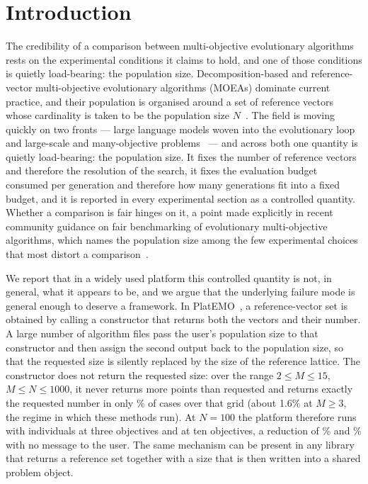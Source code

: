 \documentclass{SCIS2026}
\begin{document}
\section{Introduction}
The credibility of a comparison between multi-objective evolutionary algorithms rests on the experimental conditions it claims to hold, and one of those conditions is quietly load-bearing: the population size. Decomposition-based and reference-vector multi-objective evolutionary algorithms (MOEAs) dominate current practice, and their population is organised around a set of reference vectors whose cardinality is taken to be the population size $N$~\cite{1,2,3}. The field is moving quickly on two fronts --- large language models woven into the evolutionary loop~\cite{4,5,6} and large-scale and many-objective problems~\cite{7,8} --- and across both one quantity is quietly load-bearing: the population size. It fixes the number of reference vectors and therefore the resolution of the search, it fixes the evaluation budget consumed per generation and therefore how many generations fit into a fixed budget, and it is reported in every experimental section as a controlled quantity. Whether a comparison is fair hinges on it, a point made explicitly in recent community guidance on fair benchmarking of evolutionary multi-objective algorithms, which names the population size among the few experimental choices that most distort a comparison~\cite{9,10}.

We report that in a widely used platform this controlled quantity is not, in general, what it appears to be, and we argue that the underlying failure mode is general enough to deserve a framework. In PlatEMO~\cite{11}, a reference-vector set is obtained by calling a constructor that returns both the vectors and their number. A large number of algorithm files pass the user's population size to that constructor and then assign the second output back to the population size, so that the requested size is silently replaced by the size of the reference lattice. The constructor does not return the requested size: over the range $2\le M\le 15$, $M\le N\le 1000$, it never returns more points than requested and returns exactly the requested number in only \retExactFrac\% of cases over that grid (about 1.6\% at $M\ge3$, the regime in which these methods run). At $N=100$ the platform therefore runs with \retMthree{} individuals at three objectives and \retMten{} at ten objectives, a reduction of \retMthreeDef\% and \retMtenDef\% with no message to the user. The same mechanism can be present in any library that returns a reference set together with a size that is then written into a shared problem object.
\end{document}

